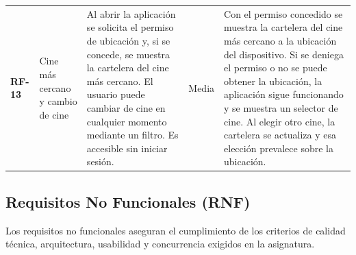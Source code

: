 \documentclass[11pt,a4paper]{article}
\begin{document}
\begin{longtable}{L{1.4cm} L{2.4cm} L{4.4cm} L{1.2cm} L{4.3cm}}
\midrule
\textbf{RF-13} & Cine más cercano y cambio de cine & Al abrir la aplicación se solicita el permiso de ubicación y, si se concede, se muestra la cartelera del cine más cercano. El usuario puede cambiar de cine en cualquier momento mediante un filtro. Es accesible sin iniciar sesión. & Media & Con el permiso concedido se muestra la cartelera del cine más cercano a la ubicación del dispositivo. Si se deniega el permiso o no se puede obtener la ubicación, la aplicación sigue funcionando y se muestra un selector de cine. Al elegir otro cine, la cartelera se actualiza y esa elección prevalece sobre la ubicación. \\
\end{longtable}

\subsection{Requisitos No Funcionales (RNF)}
Los requisitos no funcionales aseguran el cumplimiento de los criterios de calidad técnica, arquitectura, usabilidad y concurrencia exigidos en la asignatura.
\end{document}
